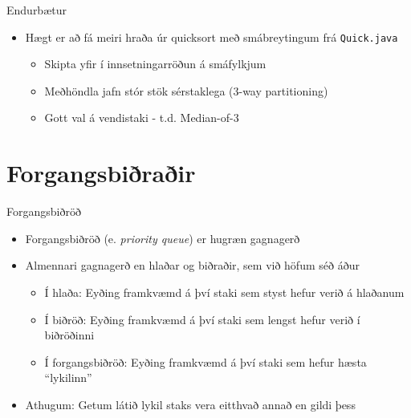 \documentclass[handout]{beamer}
\begin{document}
\begin{frame}{Endurbætur}
	\begin{itemize}
		\item Hægt er að fá meiri hraða úr quicksort með smábreytingum frá \texttt{Quick.java}
		      \begin{itemize}
			      \item Skipta yfir í innsetningarröðun á smáfylkjum
			      \item Meðhöndla jafn stór stök sérstaklega (3-way partitioning)
			      \item Gott val á vendistaki - t.d. Median-of-3
		      \end{itemize}
	\end{itemize}
\end{frame}


\section{Forgangsbiðraðir}

\begin{frame}{Forgangsbiðröð}
	\begin{itemize}
		\item Forgangsbiðröð (e. \emph{priority queue}) er hugræn gagnagerð
		\item Almennari gagnagerð en hlaðar og biðraðir, sem við höfum séð áður
		      \begin{itemize}
			      \item Í hlaða: Eyðing framkvæmd á því staki sem styst hefur verið á hlaðanum
			      \item Í biðröð: Eyðing framkvæmd á því staki sem lengst hefur verið í biðröðinni
			      \item Í forgangsbiðröð: Eyðing framkvæmd á því staki sem hefur hæsta ``lykilinn''
			  \end{itemize}
		\item Athugum: Getum látið lykil staks vera eitthvað annað en gildi þess 
	\end{itemize}
\end{frame}
\end{document}
